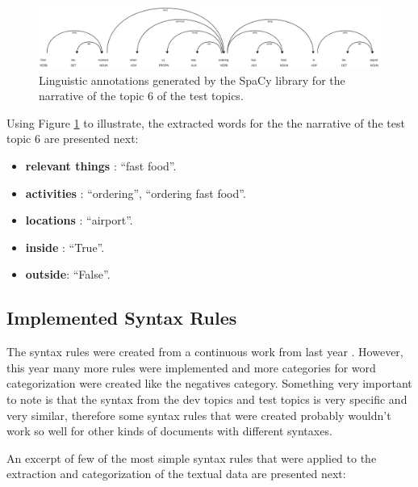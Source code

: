 \begin{figure}[H]
    \centering
    \captionsetup{justification=centering}
    \includegraphics[width =  \textwidth]{Sections/6textprocessing/images/spacy.png}
    \caption[SpaCy linguistic annotations generated]{Linguistic annotations generated by the SpaCy library \cite{Spacy2017} for the narrative of the topic 6 of the test topics.}
    \label{fig:spacy_labels}
  \end{figure}

 \newpage
Using Figure \ref{fig:spacy_labels} to illustrate, the extracted words for the the narrative of the test topic 6 are presented next:

    \begin{itemize}
      \itemsep0em
        \item \textbf{relevant things} : \enquote{fast food}.
        \item \textbf{activities} : \enquote{ordering}, \enquote{ordering fast food}.
        \item \textbf{locations} : \enquote{airport}.
        \item \textbf{inside} : \enquote{True}.
        \item \textbf{outside}: \enquote{False}.
       
    \end{itemize}

  \subsection{Implemented Syntax Rules}
  The syntax rules were created from a continuous work from last year \cite{Ribeiro2019}. However, this year many more rules were implemented and more categories for word categorization were created like the negatives category. Something very important to note is that the syntax from the dev topics and test topics is very specific and very similar, therefore some syntax rules that were created probably wouldn't work so well for other kinds of documents with different syntaxes.

  An excerpt of few of the most simple syntax rules that were applied to the extraction and categorization of the textual data are presented next:
  

